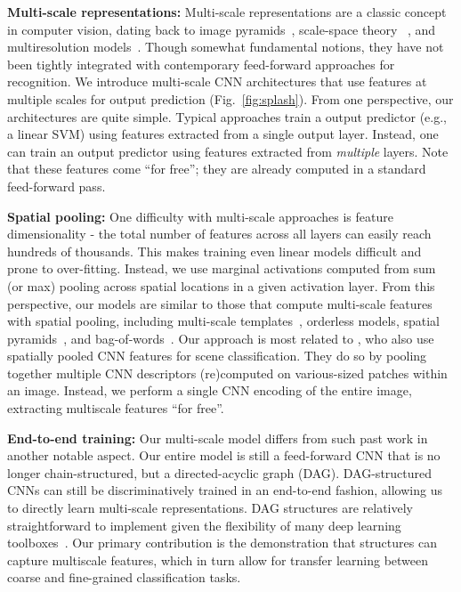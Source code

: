 \documentclass[10pt,twocolumn,letterpaper]{article}
\begin{document}
{\bf Multi-scale representations:}  Multi-scale representations are a classic concept in computer vision, dating back to image pyramids~\cite{burt1983laplacian}, scale-space theory ~\cite{lindeberg1993scale}, and multiresolution models~\cite{mallat1999wavelet}. Though somewhat fundamental notions, they have not been tightly integrated with contemporary feed-forward approaches for recognition. We introduce multi-scale CNN architectures that use features at multiple scales for output prediction (Fig.~\ref{fig:splash}). From one perspective, our architectures are quite simple. Typical approaches train a output predictor (e.g., a linear SVM) using features extracted from a single output layer. Instead, one can train an output predictor using features extracted from {\em multiple} layers. Note that these features come ``for free''; they are already computed in a standard feed-forward pass.

{\bf Spatial pooling:} One difficulty with multi-scale approaches is feature dimensionality - the total number of features across all layers can easily reach hundreds of thousands. This makes training even linear models difficult and prone to over-fitting. Instead, we use marginal activations computed from sum (or max) pooling across spatial locations in a given activation layer. From this perspective, our models are similar to those that compute multi-scale features with spatial pooling, including multi-scale templates~\cite{felzenszwalb2008discriminatively}, orderless models\cite{Gong14}, spatial pyramids~\cite{spatial_pyramid}, and bag-of-words~\cite{sivic2003video}. Our approach is most related to \cite{Gong14}, who also use spatially pooled CNN features for scene classification. They do so by pooling together multiple CNN descriptors (re)computed on various-sized patches within an image. Instead, we perform a single CNN encoding of the entire image, extracting multiscale features ``for free''.

{\bf End-to-end training:} Our multi-scale model differs from such past work in another notable aspect. Our entire model is still a feed-forward CNN that is no longer chain-structured, but a directed-acyclic graph (DAG). DAG-structured CNNs can still be discriminatively trained in an end-to-end fashion, allowing us to directly learn multi-scale representations. %
DAG structures are relatively straightforward to implement given the flexibility of many deep learning toolboxes~\cite{vedaldimatconvnet,Caffe,overfeat}. Our primary contribution is the demonstration that structures can capture multiscale features, which in turn allow for transfer learning between coarse and fine-grained classification tasks.
\end{document}
